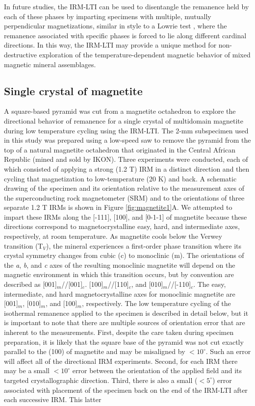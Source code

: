 \documentclass[draft,gc]{AGUTeX}
\begin{document}
\begin{article}
In future studies, the IRM-LTI can be used to disentangle the remanence held by each of these phases by imparting specimens with multiple, mutually perpendicular magnetizations, similar in style to a Lowrie test \citep{Lowrie1990a}, where the remanence associated with specific phases is forced to lie along different cardinal directions. In this way, the IRM-LTI may provide a unique method for non-destructive exploration of the temperature-dependent magnetic behavior of mixed magnetic mineral assemblages. 

\subsection{Single crystal of magnetite}

A square-based pyramid was cut from a magnetite octahedron to explore the directional behavior of remanence for a single crystal of multidomain magnetite during low temperature cycling using the IRM-LTI. The 2-mm subspecimen used in this study was prepared using a low-speed saw to remove the pyramid from the top of a natural magnetite octahedron that originated in the Central African Republic (mined and sold by IKON). Three experiments were conducted, each of which consisted of applying a strong (1.2 T) IRM in a distinct direction and then cycling that magnetization to low-temperature (20 K) and back. A schematic drawing of the specimen and its orientation relative to the measurement axes of the superconducting rock magnetometer (SRM) and to the orientations of three separate 1.2 T IRMs is shown in Figure \ref{fig:magnetite1}A. We attempted to impart these IRMs along the [-111], [100], and [0-1-1] of magnetite because these directions correspond to magnetocrystalline easy, hard, and intermediate axes, respectively, at room temperature. As magnetite cools below the Verwey transition (T$_{V}$), the mineral experiences a first-order phase transition where its crystal symmetry changes from cubic (c) to monoclinic (m). The orientations of the \textit{a}, \textit{b}, and \textit{c} axes of the resulting monoclinic magnetite will depend on the magnetic environment in which this transition occurs, but by convention are described as [001]$_{m}$//[001]$_{c}$. [100]$_{m}$//[110]$_{c}$, and [010]$_{m}$//[-110]$_{c}$. The easy, intermediate, and hard magnetocrystalline axes for monoclinic magnetite are [001]$_{m}$, [010]$_{m}$, and [100]$_{m}$, respectively. The low temperature cycling of the isothermal remanence applied to the specimen is described in detail below, but it is important to note that there are multiple sources of orientation error that are inherent to the measurements.  First, despite the care taken during specimen preparation, it is likely that the square base of the pyramid was not cut exactly parallel to the (100) of magnetite and may be misaligned by $<10^{\circ}$. Such an error will affect all of the directional IRM experiments.  Second, for each IRM there may be a small $<10^{\circ}$ error between the orientation of the applied field and its targeted crystallographic direction. Third, there is also a small ($<5^{\circ}$) error associated with placement of the specimen back on the end of the IRM-LTI after each successive IRM. This latter 
\end{article}
\end{document}
